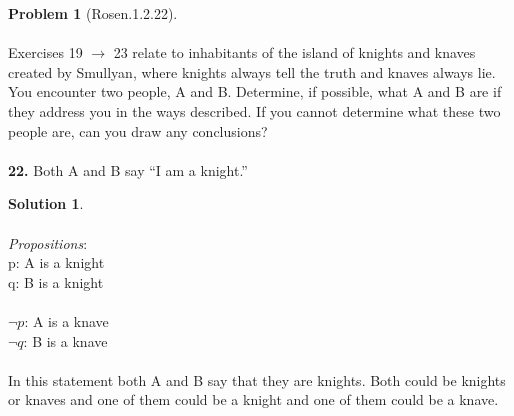 \documentclass{article}
\theoremstyle{definition}
\newtheorem*{problem}{Problem}
\newtheorem*{solution}{Solution}
\begin{document}
\begin{problem}[Rosen.1.2.22]\ \\
\ \\
Exercises 19 $\rightarrow$ 23 relate to inhabitants of the island of knights
and knaves created by Smullyan, where knights always tell
the truth and knaves always lie. You encounter two people,
A and B. Determine, if possible, what A and B are if they
address you in the ways described. If you cannot determine
what these two people are, can you draw any conclusions?\ \\
\ \\
\textbf{22.} Both A and B say “I am a knight.”
\begin{compactenum}
\renewcommand{\theenumi}{\alph{enumi}}

\end{compactenum}
\end{problem}

\begin{solution}\ \\
\ \\
\textit{Propositions}:\ \\
p: A is a knight\ \\
q: B is a knight\ \\
\ \\
$\neg p$: A is a knave\ \\
$\neg q$: B is a knave\ \\
\ \\
In this statement both A and B say that they are knights. Both could be knights or knaves and one of them could be a knight and one of them could be a knave. 

\begin{compactenum}
\renewcommand{\theenumi}{\alph{enumi}}


\end{compactenum}
\end{solution}
\end{document}
